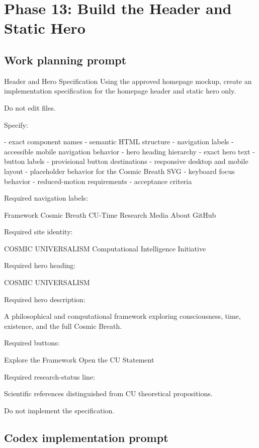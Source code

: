 \documentclass[11pt,letterpaper]{article}
\begin{document}
\section{Phase 13: Build the Header and Static Hero}

\subsection{Work planning prompt}

\begin{promptbox}{Header and Hero Specification}
Using the approved homepage mockup, create an implementation
specification for the homepage header and static hero only.

Do not edit files.

Specify:

- exact component names
- semantic HTML structure
- navigation labels
- accessible mobile navigation behavior
- hero heading hierarchy
- exact hero text
- button labels
- provisional button destinations
- responsive desktop and mobile layout
- placeholder behavior for the Cosmic Breath SVG
- keyboard focus behavior
- reduced-motion requirements
- acceptance criteria

Required navigation labels:

Framework
Cosmic Breath
CU-Time
Research
Media
About
GitHub

Required site identity:

COSMIC UNIVERSALISM
Computational Intelligence Initiative

Required hero heading:

COSMIC UNIVERSALISM

Required hero description:

A philosophical and computational framework exploring
consciousness, time, existence, and the full Cosmic Breath.

Required buttons:

Explore the Framework
Open the CU Statement

Required research-status line:

Scientific references distinguished from CU theoretical
propositions.

Do not implement the specification.
\end{promptbox}

\subsection{Codex implementation prompt}
\end{document}
